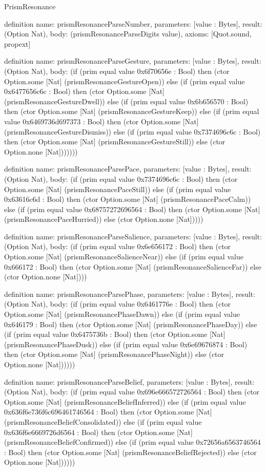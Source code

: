 \begin{lexlean}{PrismResonance}
\begin{semanticmodule}
definition{
  name: prismResonanceParseNumber,
  parameters: [value : Bytes],
  result: (Option Nat),
  body: (prismResonanceParseDigits value),
  axioms: [Quot.sound, propext]
}

definition{
  name: prismResonanceParseGesture,
  parameters: [value : Bytes],
  result: (Option Nat),
  body: (if (prim equal value 0x6f70656e : Bool) then (ctor Option.some [Nat] (prismResonanceGestureOpen)) else (if (prim equal value 0x6477656c6c : Bool) then (ctor Option.some [Nat] (prismResonanceGestureDwell)) else (if (prim equal value 0x6b656570 : Bool) then (ctor Option.some [Nat] (prismResonanceGestureKeep)) else (if (prim equal value 0x6469736d697373 : Bool) then (ctor Option.some [Nat] (prismResonanceGestureDismiss)) else (if (prim equal value 0x7374696c6c : Bool) then (ctor Option.some [Nat] (prismResonanceGestureStill)) else (ctor Option.none [Nat]))))))
}

definition{
  name: prismResonanceParsePace,
  parameters: [value : Bytes],
  result: (Option Nat),
  body: (if (prim equal value 0x7374696c6c : Bool) then (ctor Option.some [Nat] (prismResonancePaceStill)) else (if (prim equal value 0x63616c6d : Bool) then (ctor Option.some [Nat] (prismResonancePaceCalm)) else (if (prim equal value 0x68757272696564 : Bool) then (ctor Option.some [Nat] (prismResonancePaceHurried)) else (ctor Option.none [Nat]))))
}

definition{
  name: prismResonanceParseSalience,
  parameters: [value : Bytes],
  result: (Option Nat),
  body: (if (prim equal value 0x6e656172 : Bool) then (ctor Option.some [Nat] (prismResonanceSalienceNear)) else (if (prim equal value 0x666172 : Bool) then (ctor Option.some [Nat] (prismResonanceSalienceFar)) else (ctor Option.none [Nat])))
}

definition{
  name: prismResonanceParsePhase,
  parameters: [value : Bytes],
  result: (Option Nat),
  body: (if (prim equal value 0x6461776e : Bool) then (ctor Option.some [Nat] (prismResonancePhaseDawn)) else (if (prim equal value 0x646179 : Bool) then (ctor Option.some [Nat] (prismResonancePhaseDay)) else (if (prim equal value 0x6475736b : Bool) then (ctor Option.some [Nat] (prismResonancePhaseDusk)) else (if (prim equal value 0x6e69676874 : Bool) then (ctor Option.some [Nat] (prismResonancePhaseNight)) else (ctor Option.none [Nat])))))
}

definition{
  name: prismResonanceParseBelief,
  parameters: [value : Bytes],
  result: (Option Nat),
  body: (if (prim equal value 0x696e666572726564 : Bool) then (ctor Option.some [Nat] (prismResonanceBeliefInferred)) else (if (prim equal value 0x636f6e736f6c696461746564 : Bool) then (ctor Option.some [Nat] (prismResonanceBeliefConsolidated)) else (if (prim equal value 0x636f6e6669726d6564 : Bool) then (ctor Option.some [Nat] (prismResonanceBeliefConfirmed)) else (if (prim equal value 0x72656a6563746564 : Bool) then (ctor Option.some [Nat] (prismResonanceBeliefRejected)) else (ctor Option.none [Nat])))))
}


\end{semanticmodule}
\end{lexlean}
